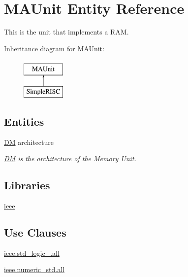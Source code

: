 \hypertarget{class_m_a_unit}{\section{M\-A\-Unit Entity Reference}
\label{class_m_a_unit}
}


This is the unit that implements a R\-A\-M.  


Inheritance diagram for M\-A\-Unit\-:\begin{figure}[H]
\begin{center}
\leavevmode
\includegraphics[height=2.000000cm]{class_m_a_unit}
\end{center}
\end{figure}
\subsection*{Entities}
\begin{DoxyCompactItemize}
\item 
\hyperlink{class_m_a_unit_1_1_d_m}{D\-M} architecture
\begin{DoxyCompactList}\small\item\em \hyperlink{class_m_a_unit_1_1_d_m}{D\-M} is the architecture of the Memory Unit. \end{DoxyCompactList}\end{DoxyCompactItemize}
\subsection*{Libraries}
 \begin{DoxyCompactItemize}
\item 
\hypertarget{class_m_a_unit_a0a6af6eef40212dbaf130d57ce711256}{\hyperlink{class_m_a_unit_a0a6af6eef40212dbaf130d57ce711256}{ieee} }\label{class_m_a_unit_a0a6af6eef40212dbaf130d57ce711256}

\end{DoxyCompactItemize}
\subsection*{Use Clauses}
 \begin{DoxyCompactItemize}
\item 
\hypertarget{class_m_a_unit_a43ecb358105806229eb7a3074fc4d577}{\hyperlink{class_m_a_unit_a43ecb358105806229eb7a3074fc4d577}{ieee.\-std\-\_\-logic\-\_.\-all}   }\label{class_m_a_unit_a43ecb358105806229eb7a3074fc4d577}

\item 
\hypertarget{class_m_a_unit_a631689596594b2068e0ee8dadd0931fe}{\hyperlink{class_m_a_unit_a631689596594b2068e0ee8dadd0931fe}{ieee.\-numeric\-\_\-std.\-all}   }\label{class_m_a_unit_a631689596594b2068e0ee8dadd0931fe}

\end{DoxyCompactItemize}
